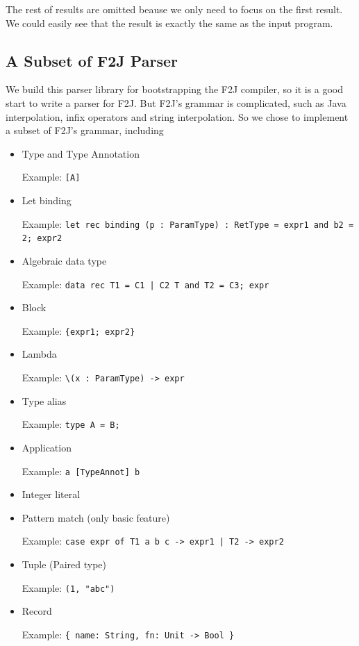 The rest of results are omitted beause we only need to focus on the first result. We could easily see that the result is exactly the same as the input program.

\subsection{A Subset of F2J Parser} \label{section:f2j_parser}

We build this parser library for bootstrapping the F2J compiler, so it is a good start to write a parser for F2J. But F2J's grammar is complicated, such as Java interpolation, infix operators and string interpolation. So we chose to implement a subset of F2J's grammar, including

\begin{itemize}
\item Type and Type Annotation

Example: \texttt{[A]}

\item Let binding

Example: \texttt{let rec binding (p : ParamType) : RetType = expr1 and b2 = 2; expr2}

\item Algebraic data type

Example: \texttt{data rec T1 = C1 | C2 T and T2 = C3; expr}

\item Block

Example: \texttt{\{expr1; expr2\}}

\item Lambda

Example: \texttt{\textbackslash (x : ParamType) -> expr}

\item Type alias

Example: \texttt{type A = B;}

\item Application

Example: \texttt{a [TypeAnnot] b}

\item Integer literal
\item Pattern match (only basic feature)

Example: \texttt{case expr of T1 a b c -> expr1 | T2 -> expr2}

\item Tuple (Paired type)

Example: \texttt{(1, "abc")}

\item Record

Example: \texttt{\{ name: String, fn: Unit -> Bool \}}

\end{itemize}

